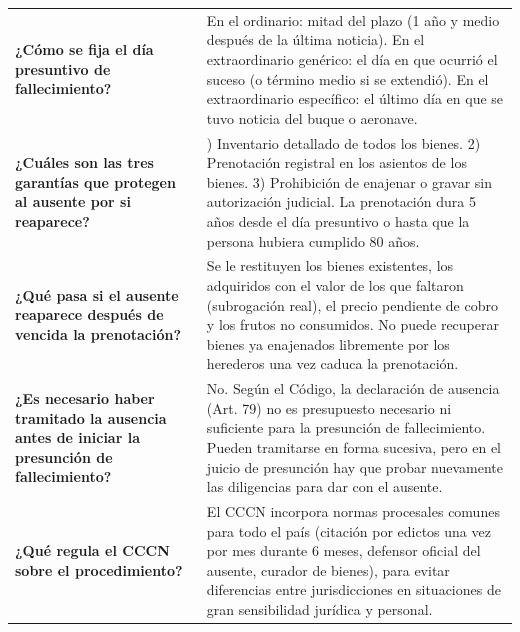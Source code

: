 \documentclass[12pt,oneside]{book}
\begin{document}
\begin{longtable}{
    >{\raggedright\arraybackslash}p{}
    >{\raggedright\arraybackslash}p{}
}
\textbf{¿Cómo se fija el día presuntivo de fallecimiento?} &
En el ordinario: mitad del plazo (1 año y medio después de la última
noticia). En el extraordinario genérico: el día en que ocurrió el suceso
(o término medio si se extendió). En el extraordinario específico: el
último día en que se tuvo noticia del buque o aeronave. \\

\textbf{¿Cuáles son las tres garantías que protegen al ausente por si
reaparece?} &
1) Inventario detallado de todos los bienes. 2) Prenotación registral en
los asientos de los bienes. 3) Prohibición de enajenar o gravar sin
autorización judicial. La prenotación dura 5 años desde el día presuntivo
o hasta que la persona hubiera cumplido 80 años. \\

\textbf{¿Qué pasa si el ausente reaparece después de vencida la
prenotación?} &
Se le restituyen los bienes existentes, los adquiridos con el valor de
los que faltaron (subrogación real), el precio pendiente de cobro y los
frutos no consumidos. No puede recuperar bienes ya enajenados libremente
por los herederos una vez caduca la prenotación. \\

\textbf{¿Es necesario haber tramitado la ausencia antes de iniciar la
presunción de fallecimiento?} &
No. Según el Código, la declaración de ausencia (Art. 79) no es
presupuesto necesario ni suficiente para la presunción de fallecimiento.
Pueden tramitarse en forma sucesiva, pero en el juicio de presunción hay
que probar nuevamente las diligencias para dar con el ausente. \\

\textbf{¿Qué regula el CCCN sobre el procedimiento?} &
El CCCN incorpora normas procesales comunes para todo el país (citación
por edictos una vez por mes durante 6 meses, defensor oficial del
ausente, curador de bienes), para evitar diferencias entre jurisdicciones
en situaciones de gran sensibilidad jurídica y personal. \\

\midrule


\end{longtable}
\end{document}
